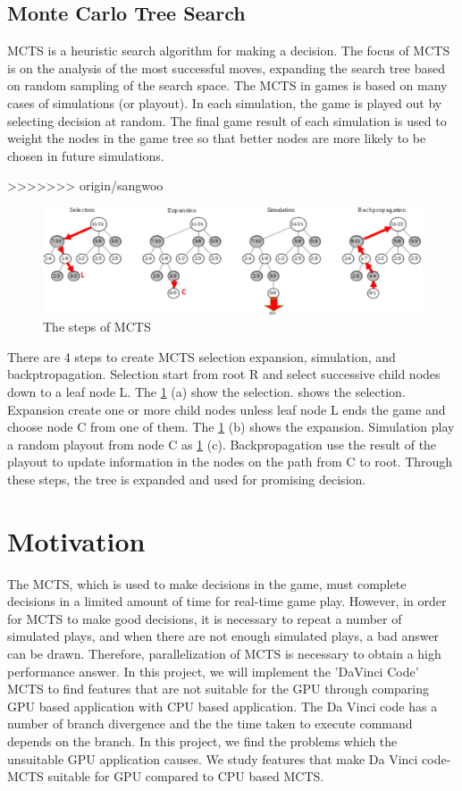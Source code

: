 \documentclass[conference]{IEEEtran}
\begin{document}
\subsection{Monte Carlo Tree Search} \label{sec:mcts}

MCTS is a heuristic search algorithm for making a decision.
The focus of MCTS is on the analysis of the most successful moves, expanding the search tree based on random sampling of the search space.
The MCTS in games is based on many cases of simulations (or playout).
In each simulation, the game is played out by selecting decision at random.
The final game result of each simulation is used to weight the nodes in the game tree so that better nodes are more likely to be chosen in future simulations.

>>>>>>> origin/sangwoo
\begin{figure}
\includegraphics[width=2.05\columnwidth]{figures/MCTS_step.pdf}
\caption{The steps of MCTS}
\label{fig:MCTS_step}
\end{figure}

There are 4 steps to create MCTS selection expansion, simulation, and backptropagation.
Selection start from root R and select successive child nodes down to a leaf node L. The \cref{fig:MCTS_step} (a) show the selection. shows the selection.
Expansion create one or more child nodes unless leaf node L ends the game and choose node C from one of them. The \cref{fig:MCTS_step} (b) shows the expansion.
Simulation play a random playout from node C as \cref{fig:MCTS_step} (c).
Backpropagation use the result of the playout to update information in the nodes on the path from C to root.
Through these steps, the tree is expanded and used for promising decision.

\section{Motivation}
The MCTS, which is used to make decisions in the game, must complete decisions in a limited amount of time for real-time game play. 
However, in order for MCTS to make good decisions, it is necessary to repeat a number of simulated plays, and when there are not enough simulated plays, a bad answer can be drawn. 
Therefore, parallelization of MCTS is necessary to obtain a high performance answer.
In this project, we will implement the 'DaVinci Code' MCTS to find features that are not suitable for the GPU through comparing GPU based application with CPU based application.
The Da Vinci code has a number of branch divergence and the the time taken to execute command depends on the branch.
In this project, we find the problems which the unsuitable GPU application causes.
We study features that make Da Vinci code-MCTS suitable for GPU compared to CPU based MCTS.
\end{document}
